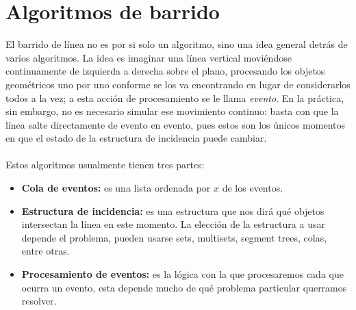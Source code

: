 \section{Algoritmos de barrido\adv}
El barrido de línea no es por si solo un algoritmo, sino una idea general detrás de varios algoritmos. La idea es imaginar una línea vertical moviéndose continuamente de izquierda a derecha sobre el
plano, procesando los objetos geométricos uno por uno conforme se los va encontrando en lugar de considerarlos
todos a la vez; a esta acción de procesamiento se le llama \textit{evento}. En la práctica, sin
embargo, no es necesario simular ese movimiento continuo: basta con que la línea salte directamente
de evento en evento, pues estos son los únicos momentos en que el estado de la estructura de
incidencia puede cambiar.
\\\\Estos algoritmos usualmente tienen tres partes:
\begin{itemize}
  \item \textbf{Cola de eventos:} es una lista ordenada por $x$ de los eventos.
  \item \textbf{Estructura de incidencia:} es una estructura que nos dirá qué objetos intersectan la línea en este momento. La elección de la estructura a usar depende el problema, pueden usarse sets, multisets, segment trees, colas, entre otras.
  \item \textbf{Procesamiento de eventos:} es la lógica con la que procesaremos cada que ocurra un evento, esta depende mucho de qué problema particular querramos resolver.
\end{itemize}

